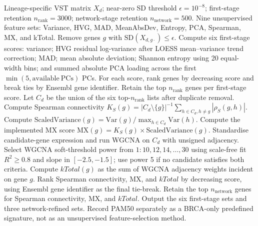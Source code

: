 \begin{algorithm}[H]
\caption{Unsupervised feature selection}
\label{alg:supp_unsupervised_feature_selection}
\small
\begin{algorithmic}[1]
\Require Lineage-specific VST matrix \(X_d\); near-zero SD threshold \(\epsilon=10^{-8}\); first-stage retention \(n_{\mathrm{rank}}=3000\); network-stage retention \(n_{\mathrm{network}}=500\).
\Ensure Nine unsupervised feature sets: Variance, HVG, MAD, MeanAbsDev, Entropy, PCA, Spearman, MX, and kTotal.
\State Remove genes \(g\) with \(\mathrm{SD}(X_{d,g\cdot}) \leq \epsilon\).
\State Compute six first-stage scores: variance; HVG residual log-variance after LOESS mean--variance trend correction; MAD; mean absolute deviation; Shannon entropy using 20 equal-width bins; and summed absolute PCA loading across the first \(\min(5,\mathrm{available\ PCs})\) PCs.
\State For each score, rank genes by decreasing score and break ties by Ensembl gene identifier.
\State Retain the top \(n_{\mathrm{rank}}\) genes per first-stage score.
\State Let \(C_d\) be the union of the six top-\(n_{\mathrm{rank}}\) lists after duplicate removal.
  \State Compute Spearman connectivity \(K_S(g)=|C_d\setminus\{g\}|^{-1}\sum_{h\in C_d,h\neq g}|\rho_S(g,h)|\).
  \State Compute \(\mathrm{ScaledVariance}(g)=\mathrm{Var}(g)/\max_{h\in C_d}\mathrm{Var}(h)\).
  \State Compute the implemented MX score \(\mathrm{MX}(g)=K_S(g)\times\mathrm{ScaledVariance}(g)\).
\EndFor
\State Standardise candidate-gene expression and run WGCNA on \(C_d\) with unsigned adjacency.
\State Select WGCNA soft-threshold power from \(1{:}10,12,14,\ldots,30\) using scale-free fit \(R^2\geq0.8\) and slope in \([-2.5,-1.5]\); use power 5 if no candidate satisfies both criteria.
\State Compute \(kTotal(g)\) as the sum of WGCNA adjacency weights incident on gene \(g\).
\State Rank Spearman connectivity, MX, and \(kTotal\) by decreasing score, using Ensembl gene identifier as the final tie-break.
\State Retain the top \(n_{\mathrm{network}}\) genes for Spearman connectivity, MX, and \(kTotal\).
\State Output the six first-stage sets and three network-refined sets.
\State Record PAM50 separately as a BRCA-only predefined signature, not as an unsupervised feature-selection method.
\end{algorithmic}
\end{algorithm}

